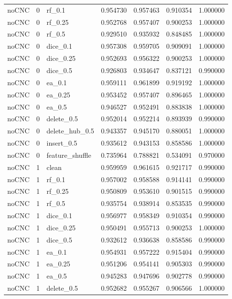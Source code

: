 \documentclass[UTF8,a4paper,11pt,fontset=fandol]{ctexart}
\begin{document}
{\begin{longtable}{lrlrrrr}
noCNC & 0 & rf\_0.1 & 0.954730 & 0.957463 & 0.910354 & 1.000000 \\
noCNC & 0 & rf\_0.25 & 0.952768 & 0.957407 & 0.900253 & 1.000000 \\
noCNC & 0 & rf\_0.5 & 0.929510 & 0.935932 & 0.848485 & 1.000000 \\
noCNC & 0 & dice\_0.1 & 0.957308 & 0.959705 & 0.909091 & 1.000000 \\
noCNC & 0 & dice\_0.25 & 0.952693 & 0.956322 & 0.900253 & 1.000000 \\
noCNC & 0 & dice\_0.5 & 0.926803 & 0.934647 & 0.837121 & 0.990000 \\
noCNC & 0 & ea\_0.1 & 0.959111 & 0.961899 & 0.919192 & 1.000000 \\
noCNC & 0 & ea\_0.25 & 0.953452 & 0.957407 & 0.896465 & 1.000000 \\
noCNC & 0 & ea\_0.5 & 0.946527 & 0.952491 & 0.883838 & 1.000000 \\
noCNC & 0 & delete\_0.5 & 0.952014 & 0.952214 & 0.893939 & 0.990000 \\
noCNC & 0 & delete\_hub\_0.5 & 0.943357 & 0.945170 & 0.880051 & 1.000000 \\
noCNC & 0 & insert\_0.5 & 0.935612 & 0.943153 & 0.858586 & 1.000000 \\
noCNC & 0 & feature\_shuffle & 0.735964 & 0.788821 & 0.534091 & 0.970000 \\
noCNC & 1 & clean & 0.959959 & 0.961615 & 0.921717 & 0.990000 \\
noCNC & 1 & rf\_0.1 & 0.957002 & 0.958588 & 0.914141 & 0.990000 \\
noCNC & 1 & rf\_0.25 & 0.950809 & 0.953610 & 0.901515 & 0.990000 \\
noCNC & 1 & rf\_0.5 & 0.935754 & 0.938914 & 0.853535 & 0.990000 \\
noCNC & 1 & dice\_0.1 & 0.956977 & 0.958349 & 0.910354 & 0.990000 \\
noCNC & 1 & dice\_0.25 & 0.950491 & 0.955713 & 0.900253 & 1.000000 \\
noCNC & 1 & dice\_0.5 & 0.932612 & 0.936638 & 0.858586 & 0.990000 \\
noCNC & 1 & ea\_0.1 & 0.954931 & 0.957222 & 0.915404 & 0.990000 \\
noCNC & 1 & ea\_0.25 & 0.951206 & 0.954141 & 0.905303 & 0.990000 \\
noCNC & 1 & ea\_0.5 & 0.945283 & 0.947696 & 0.902778 & 0.990000 \\
noCNC & 1 & delete\_0.5 & 0.952682 & 0.955267 & 0.906566 & 1.000000 \\

\end{longtable}}
\end{document}
